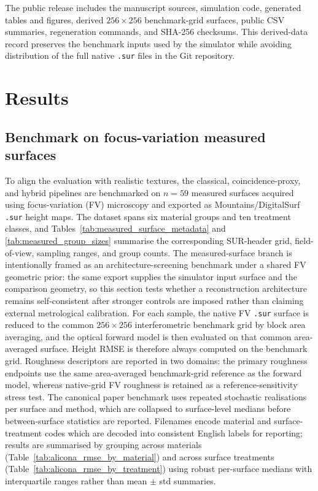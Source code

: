 \documentclass[photonics,article,submit,pdftex,moreauthors]{Definitions/mdpi}
\begin{document}
The public release includes the manuscript sources, simulation code, generated tables and figures, derived $256\times256$ benchmark-grid surfaces, public CSV summaries, regeneration commands, and SHA-256 checksums. This derived-data record preserves the benchmark inputs used by the simulator while avoiding distribution of the full native \texttt{.sur} files in the Git repository.

\section{Results}
\subsection{Benchmark on focus-variation measured surfaces}
To align the evaluation with realistic textures, the classical, coincidence-proxy, and hybrid pipelines are benchmarked on $n=59$ measured surfaces acquired using focus-variation (FV) microscopy and exported as Mountains/DigitalSurf \texttt{.sur} height maps. The dataset spans six material groups and ten treatment classes, and Tables~\ref{tab:measured_surface_metadata} and \ref{tab:measured_group_sizes} summarise the corresponding SUR-header grid, field-of-view, sampling ranges, and group counts. The measured-surface branch is intentionally framed as an architecture-screening benchmark under a shared FV geometric prior: the same export supplies the simulator input surface and the comparison geometry, so this section tests whether a reconstruction architecture remains self-consistent after stronger controls are imposed rather than claiming external metrological calibration. For each sample, the native FV \texttt{.sur} surface is reduced to the common $256\times256$ interferometric benchmark grid by block area averaging, and the optical forward model is then evaluated on that common area-averaged surface. Height RMSE is therefore always computed on the benchmark grid. Roughness descriptors are reported in two domains: the primary roughness endpoints use the same area-averaged benchmark-grid reference as the forward model, whereas native-grid FV roughness is retained as a reference-sensitivity stress test. The canonical paper benchmark uses repeated stochastic realisations per surface and method, which are collapsed to surface-level medians before between-surface statistics are reported. Filenames encode material and surface-treatment codes which are decoded into consistent English labels for reporting; results are summarised by grouping across materials (Table~\ref{tab:alicona_rmse_by_material}) and across surface treatments (Table~\ref{tab:alicona_rmse_by_treatment}) using robust per-surface medians with interquartile ranges rather than mean $\pm$ std summaries.
\end{document}
